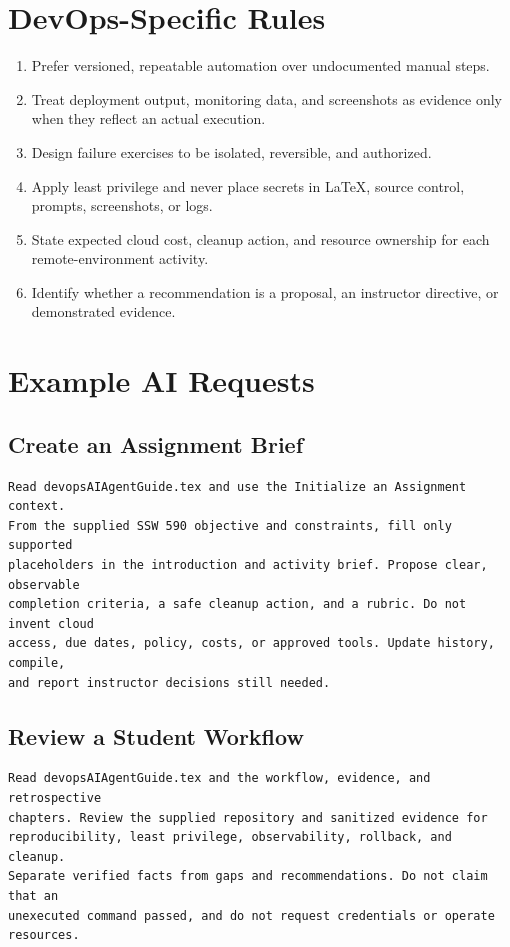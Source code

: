 \section{DevOps-Specific Rules}
\begin{enumerate}
\item Prefer versioned, repeatable automation over undocumented manual steps.
\item Treat deployment output, monitoring data, and screenshots as evidence only when they reflect an actual execution.
\item Design failure exercises to be isolated, reversible, and authorized.
\item Apply least privilege and never place secrets in LaTeX, source control, prompts, screenshots, or logs.
\item State expected cloud cost, cleanup action, and resource ownership for each remote-environment activity.
\item Identify whether a recommendation is a proposal, an instructor directive, or demonstrated evidence.
\end{enumerate}

\section{Example AI Requests}
\subsection{Create an Assignment Brief}
\begin{verbatim}
Read devopsAIAgentGuide.tex and use the Initialize an Assignment context.
From the supplied SSW 590 objective and constraints, fill only supported
placeholders in the introduction and activity brief. Propose clear, observable
completion criteria, a safe cleanup action, and a rubric. Do not invent cloud
access, due dates, policy, costs, or approved tools. Update history, compile,
and report instructor decisions still needed.
\end{verbatim}

\subsection{Review a Student Workflow}
\begin{verbatim}
Read devopsAIAgentGuide.tex and the workflow, evidence, and retrospective
chapters. Review the supplied repository and sanitized evidence for
reproducibility, least privilege, observability, rollback, and cleanup.
Separate verified facts from gaps and recommendations. Do not claim that an
unexecuted command passed, and do not request credentials or operate resources.
\end{verbatim}

